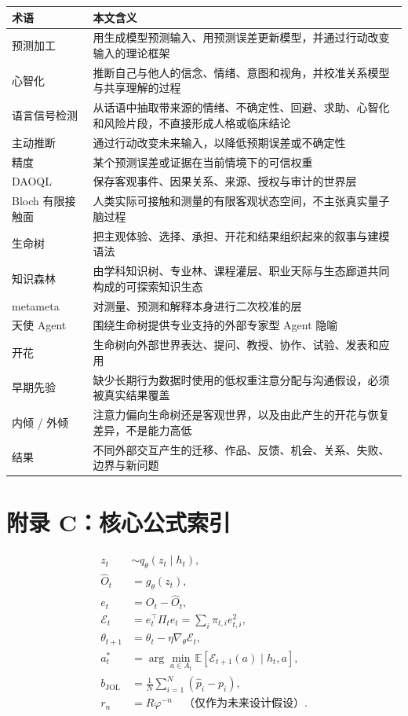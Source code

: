 \documentclass[UTF8,a4paper,11pt]{ctexart}
\begin{document}
\begin{center}
\begin{longtable}{@{}p{3.4cm}p{9.6cm}@{}}
\toprule
\textbf{术语} & \textbf{本文含义} \\
\midrule
预测加工 & 用生成模型预测输入、用预测误差更新模型，并通过行动改变输入的理论框架 \\
心智化 & 推断自己与他人的信念、情绪、意图和视角，并校准关系模型与共享理解的过程 \\
语言信号检测 & 从话语中抽取带来源的情绪、不确定性、回避、求助、心智化和风险片段，不直接形成人格或临床结论 \\
主动推断 & 通过行动改变未来输入，以降低预期误差或不确定性 \\
精度 & 某个预测误差或证据在当前情境下的可信权重 \\
DAOQL & 保存客观事件、因果关系、来源、授权与审计的世界层 \\
Bloch 有限接触面 & 人类实际可接触和测量的有限客观状态空间，不主张真实量子脑过程 \\
生命树 & 把主观体验、选择、承担、开花和结果组织起来的叙事与建模语法 \\
知识森林 & 由学科知识树、专业林、课程灌层、职业天际与生态廊道共同构成的可探索知识生态 \\
metameta & 对测量、预测和解释本身进行二次校准的层 \\
天使 Agent & 围绕生命树提供专业支持的外部专家型 Agent 隐喻 \\
开花 & 生命树向外部世界表达、提问、教授、协作、试验、发表和应用 \\
早期先验 & 缺少长期行为数据时使用的低权重注意分配与沟通假设，必须被真实结果覆盖 \\
内倾 / 外倾 & 注意力偏向生命树还是客观世界，以及由此产生的开花与恢复差异，不是能力高低 \\
结果 & 不同外部交互产生的迁移、作品、反馈、机会、关系、失败、边界与新问题 \\
\bottomrule
\end{longtable}
\end{center}

\section{附录 C：核心公式索引}

\begin{align}
z_t &\sim q_\theta(z_t\mid h_t),\\
\hat O_t &= g_\theta(z_t),\\
e_t &= O_t-\hat O_t,\\
\mathcal E_t &= e_t^{\top}\Pi_t e_t
=\sum_i\pi_{t,i}e_{t,i}^{2},\\
\theta_{t+1} &= \theta_t-\eta\nabla_\theta\mathcal E_t,\\
a_t^\ast &= \arg\min_{a\in A_t}\mathbb E[\mathcal E_{t+1}(a)\mid h_t,a],\\
b_{\mathrm{JOL}} &= \frac{1}{N}\sum_{i=1}^{N}(\hat p_i-p_i),\\
r_n &= R\varphi^{-n}\quad\text{（仅作为未来设计假设）}.
\end{align}
\end{document}
